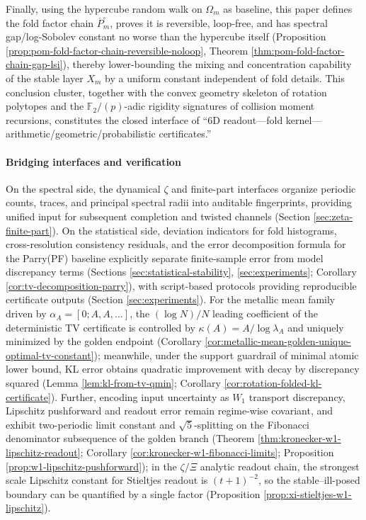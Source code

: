 Finally, using the hypercube random walk on \(\Omega_m\) as baseline, this paper defines the fold factor chain \(\overline P^{\square}_m\), proves it is reversible, loop-free, and has spectral gap/log-Sobolev constant no worse than the hypercube itself (Proposition \ref{prop:pom-fold-factor-chain-reversible-noloop}, Theorem \ref{thm:pom-fold-factor-chain-gap-lsi}), thereby lower-bounding the mixing and concentration capability of the stable layer \(X_m\) by a uniform constant independent of fold details.
This conclusion cluster, together with the convex geometry skeleton of rotation polytopes and the \(\mathbb F_2/(p)\)-adic rigidity signatures of collision moment recursions, constitutes the closed interface of ``6D readout---fold kernel---arithmetic/geometric/probabilistic certificates.''

\paragraph{Bridging interfaces and verification}
On the spectral side, the dynamical \(\zeta\) and finite-part interfaces organize periodic counts, traces, and principal spectral radii into auditable fingerprints, providing unified input for subsequent completion and twisted channels (Section \ref{sec:zeta-finite-part}). On the statistical side, deviation indicators for fold histograms, cross-resolution consistency residuals, and the error decomposition formula for the Parry(PF) baseline explicitly separate finite-sample error from model discrepancy terms (Sections \ref{sec:statistical-stability}, \ref{sec:experiments}; Corollary \ref{cor:tv-decomposition-parry}), with script-based protocols providing reproducible certificate outputs (Section \ref{sec:experiments}).
For the metallic mean family driven by \(\alpha_A=[0;A,A,\dots]\), the \((\log N)/N\) leading coefficient of the deterministic TV certificate is controlled by \(\kappa(A)=A/\log\lambda_A\) and uniquely minimized by the golden endpoint (Corollary \ref{cor:metallic-mean-golden-unique-optimal-tv-constant}); meanwhile, under the support guardrail of minimal atomic lower bound, KL error obtains quadratic improvement with decay by discrepancy squared (Lemma \ref{lem:kl-from-tv-qmin}; Corollary \ref{cor:rotation-folded-kl-certificate}).
Further, encoding input uncertainty as \(W_1\) transport discrepancy, Lipschitz pushforward and readout error remain regime-wise covariant, and exhibit two-periodic limit constant and \(\sqrt5\)-splitting on the Fibonacci denominator subsequence of the golden branch (Theorem \ref{thm:kronecker-w1-lipschitz-readout}; Corollary \ref{cor:kronecker-w1-fibonacci-limits}; Proposition \ref{prop:w1-lipschitz-pushforward}); in the \(\zeta/\Xi\) analytic readout chain, the strongest scale Lipschitz constant for Stieltjes readout is \((t+1)^{-2}\), so the stable--ill-posed boundary can be quantified by a single factor (Proposition \ref{prop:xi-stieltjes-w1-lipschitz}).
